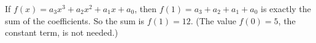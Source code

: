 If $f(x)=a_3x^3+a_2x^2+a_1x+a_0$, then $f(1)=a_3+a_2+a_1+a_0$ is exactly the sum of the coefficients. So the sum is $f(1)=\boxed{12}$. (The value $f(0)=5$, the constant term, is not needed.)
